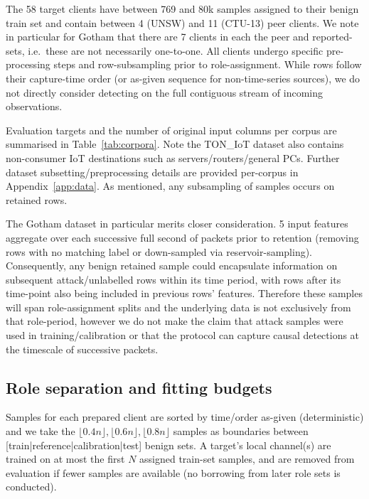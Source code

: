 The 58 target clients have between 769 and 80k samples assigned to their benign train set and contain between 4 (UNSW) and 11 (CTU-13) peer clients. We note in particular for Gotham that there are 7 clients in each the peer and reported-sets, i.e.\ these are not necessarily one-to-one. All clients undergo specific pre-processing steps and row-subsampling prior to role-assignment. While rows follow their capture-time order (or as-given sequence for non-time-series sources), we do not directly consider detecting on the full contiguous stream of incoming observations.

 

Evaluation targets and the number of original input columns per corpus are summarised in Table~\ref{tab:corpora}. Note the TON\_IoT dataset also contains non-consumer IoT destinations such as servers/routers/general PCs. Further dataset subsetting/preprocessing details are provided per-corpus in Appendix~\ref{app:data}. As mentioned, any subsampling of samples occurs on retained rows.

The Gotham dataset in particular merits closer consideration. 5 input features aggregate over each successive full second of packets prior to retention (removing rows with no matching label or down-sampled via reservoir-sampling). Consequently, any benign retained sample could encapsulate information on subsequent attack/unlabelled rows within its time period, with rows after its time-point also being included in previous rows' features. Therefore these samples will span role-assignment splits and the underlying data is not exclusively from that role-period, however we do not make the claim that attack samples were used in training/calibration or that the protocol can capture causal detections at the timescale of successive packets.

\subsection{Role separation and fitting budgets} 
Samples for each prepared client are sorted by time/order as-given (deterministic) and we take the $\lfloor 0.4n\rfloor, \lfloor 0.6n\rfloor, \lfloor 0.8n\rfloor$ samples as boundaries between [train|reference|calibration|test] benign sets. A target's local channel(s) are trained on at most the first $N$ assigned train-set samples, and are removed from evaluation if fewer samples are available (no borrowing from later role sets is conducted).

